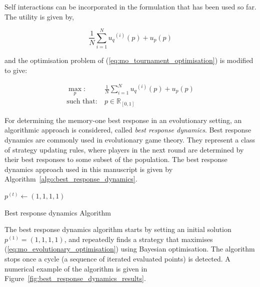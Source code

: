 \documentclass[10pt]{article}
\newcommand{\R}{\mathbb{R}}
\begin{document}
Self interactions can be incorporated in the formulation
that has been used so far. The utility is given by,

\begin{equation}
    \frac{1}{N} \sum\limits_{i=1} ^ {N} {u_q}^{(i)} (p) + u_p(p)
\end{equation}

and the optimisation problem of (\ref{eq:mo_tournament_optimisation}) is modified to give:

\begin{equation}\label{eq:mo_evolutionary_optimisation}
    \begin{aligned}
    \max_p: & \ \frac{1}{N} \sum\limits_{i=1} ^ {N} {u_q}^{(i)} (p) + u_p(p)
    \\
    \text{such that}: & \ p \in \R_{[0, 1]}
    \end{aligned}
\end{equation}

For determining the memory-one best response in an evolutionary setting,
an algorithmic approach is considered, called \textit{best
response dynamics}. Best response dynamics are commonly used in evolutionary
game theory. They represent a class of strategy updating rules, where players in
the next round are determined by their best responses to some subset of the
population. The best response dynamics approach used in this manuscript is given by
Algorithm~\ref{algo:best_response_dynamics}.

\begin{minipage}{.6\textwidth}
    \begin{algorithm}[H]
        $p^{(t)}\leftarrow (1, 1, 1, 1)$\;
        \caption{Best response dynamics Algorithm}
        \label{algo:best_response_dynamics}
    \end{algorithm}
\end{minipage}

The best response dynamics algorithm starts by setting an initial
solution \(p^{(1)}=(1, 1, 1, 1)\), and repeatedly finds a strategy that maximises
(\ref{eq:mo_evolutionary_optimisation}) using Bayesian optimisation. The
algorithm stops once a cycle (a sequence of iterated evaluated points) is
detected. A numerical example of the algorithm is given in Figure~\ref{fig:best_response_dynamics_results}.
\end{document}
